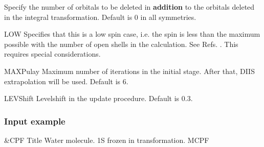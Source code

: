 \begin{keywordlist}
Specify the number of orbitals to be deleted in
{\bf addition} to the orbitals deleted in the integral transformation.  Default is 0
in all symmetries.
\item[LOW]
Specifies that this is a low spin case, i.e. the spin is less than
the maximum possible with the number of open shells in the
calculation. See Refs. \cite{Ahlrichs:85,Chong:86}.
This requires special considerations.
\item[MAXPulay]
Maximum number of iterations in the initial stage. After that, DIIS extrapolation
will be used.  Default is 6.
\item[LEVShift]
Levelshift in the update procedure. Default is 0.3.
\end{keywordlist}

\subsubsection{Input example}

\begin{inputlisting}
 &CPF
Title
 Water molecule. 1S frozen in transformation.
MCPF
\end{inputlisting}
